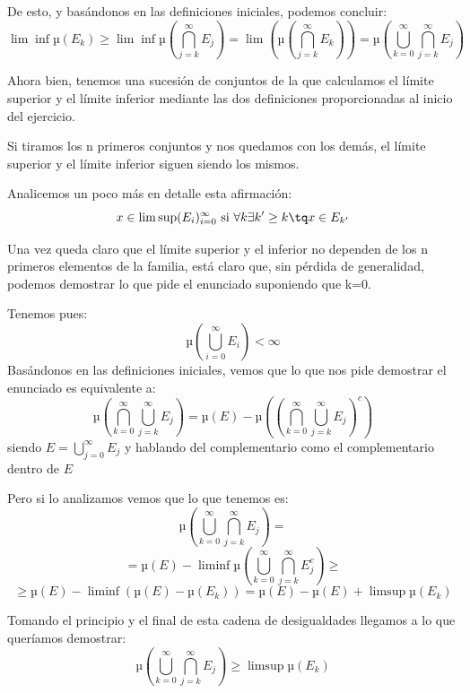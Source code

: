 \begin{problem}[6]
De esto, y basándonos en las definiciones iniciales, podemos concluir:
\[\lim \inf µ(E_k) \geq \lim \inf µ(\bigcap_{j=k}^{\infty}E_j) = \lim (µ(\bigcap_{j=k}^{\infty}E_k))=µ(\bigcup_{k=0}^{\infty}\bigcap_{j=k}^{\infty}E_j)\]

Ahora bien, tenemos una sucesión de conjuntos de la que calculamos el límite superior y el límite inferior mediante las dos definiciones proporcionadas al inicio del ejercicio.

Si tiramos los n primeros conjuntos y nos quedamos con los demás, el límite superior y el límite inferior siguen siendo los mismos.

Analicemos un poco más en detalle esta afirmación:
\[x \in \lim \sup (E_i)_{i=0}^{\infty} \text{ si } \forall k \exists k' \geq k \tq x \in E_{k'}\]

Una vez queda claro que el límite superior y el inferior no dependen de los n primeros elementos de la familia, está claro que, sin pérdida de generalidad, podemos demostrar lo que pide el enunciado suponiendo que k=0.

Tenemos pues:
\[µ(\bigcup_{i=0}^{\infty} E_i)< \infty\]
Basándonos en las definiciones iniciales, vemos que lo que nos pide demostrar el enunciado es equivalente a:
\[µ(\bigcap_{k=0}^{\infty}\bigcup_{j=k}^{\infty}E_j)= µ(E)-µ((\bigcap_{k=0}^{\infty}\bigcup_{j=k}^{\infty}E_j)^c)\]
siendo $E=\bigcup_{j=0}^{\infty}E_j$ y hablando del complementario como el complementario dentro de $E$

Pero si lo analizamos vemos que lo que tenemos es:
\[µ(\bigcup_{k=0}^{\infty}\bigcap_{j=k}^{\infty}E_j)=\]
\[=µ(E)-\liminf µ(\bigcup_{k=0}^{\infty}\bigcap_{j=k}^{\infty}E^c_j) \geq \]
\[\geq µ(E)-\liminf(µ(E)-µ(E_k))=µ(E)-µ(E)+\limsup µ(E_k)\]

Tomando el principio y el final de esta cadena de desigualdades llegamos a lo que queríamos demostrar:
\[µ(\bigcup_{k=0}^{\infty}\bigcap_{j=k}^{\infty}E_j)\geq\limsup µ(E_k)\]
\end{problem}

